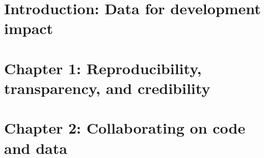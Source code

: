 %
%
%
%




\cleardoublepage
\chapter{Introduction: Data for development impact} %





\chapter{Chapter 1: Reproducibility, transparency, and credibility}
\label{ch:1}




\chapter{Chapter 2: Collaborating on code and data}
\label{ch:2}





